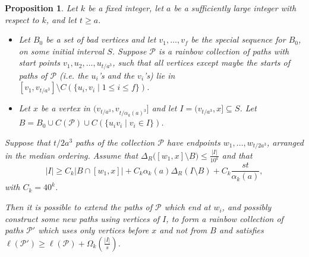 \documentclass[a4paper,11pt]{article}
\newtheorem{proposition}[theorem]{\bf Proposition}
\theoremstyle{definition}
\def\cP{\mathcal{P}}
\begin{document}
\begin{proposition}\label{prop:main induction}
Let $k$ be a fixed integer, let $a$ be a sufficiently large integer with respect to $k$, and let $t \geq a$.
\begin{itemize}
    \item Let $B_0$ be a set of bad vertices and let $v_1, \dots, v_{f}$ be the special sequence for $B_0$, on some initial interval $S$. Suppose $\cP$ is a rainbow collection of paths with start points $v_1, u_2, \dots, u_{t/a^3}$, such that all vertices except maybe the starts of paths of $\cP$ (i.e. the $u_i$'s and the $v_i$'s) lie in $[v_1, v_{t/a^3}]\setminus C(\{u_i, v_i\mid 1\leq i\leq f\})$.
    \item Let $x$ be a vertex in $(v_{t/a^3}, v_{t/\alpha_{k}(a)^3}]$ and let $I= (v_{t/a^3}, x]\subseteq S$. Let $B=B_0\cup C(\cP)\cup C(\{u_iv_i\mid v_i\in I\})$.
\end{itemize}
Suppose that $t/2a^3$ paths of the collection $\cP$ have endpoints $w_1, \dots, w_{t/2a^3}$, arranged in the median ordering. Assume that $\Delta_R\big([w_1, x]\setminus B\big)\leq \frac{|I|}{10^k}$ and that
\begin{equation}\label{eq:main proposition assumption}
|I|\geq C_k\big|B\cap [w_1, x]\big|+C_k \alpha_k(a) \Delta_R(I\setminus B)+C_k\frac{st}{\alpha_k(a)},
\end{equation}
with $C_k=40^k$.

Then it is possible to extend the paths of $\cP$ which end at $w_i$, and possibly construct some new paths using vertices of $I$, to form a rainbow collection of paths $\cP'$ which uses only vertices before $x$ and not from $B$ and satisfies $\ell(\cP')\geq \ell(\cP)+\Omega_k(\frac{|I|}{s})$.
\end{proposition}
\end{document}

